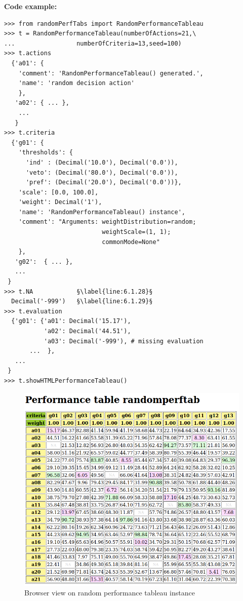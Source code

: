 \noindent \textbf{Code example:}
\begin{lstlisting}[caption={Generating a random performance tableau},label=list:6.1]
>>> from randomPerfTabs import RandomPerformanceTableau
>>> t = RandomPerformanceTableau(numberOfActions=21,\
...                 numberOfCriteria=13,seed=100)
>>> t.actions
  {'a01': {
    'comment': 'RandomPerformanceTableau() generated.',
    'name': 'random decision action'
    },
   'a02': { ... },
    ...
   }
>>> t.criteria
  {'g01': {
    'thresholds': {
      'ind' : (Decimal('10.0'), Decimal('0.0')),
      'veto': (Decimal('80.0'), Decimal('0.0')),
      'pref': (Decimal('20.0'), Decimal('0.0'))},
    'scale': [0.0, 100.0],
    'weight': Decimal('1'),
    'name': 'RandomPerformanceTableau() instance',
    'comment': "Arguments: weightDistribution=random;
                           weightScale=(1, 1);
                           commonMode=None"
    },
   'g02':  { ... },
   ...
 }
>>> t.NA            §\label{line:6.1.28}§
  Decimal('-999')   §\label{line:6.1.29}§
>>> t.evaluation
  {'g01': {'a01': Decimal('15.17'),
           'a02': Decimal('44.51'),
           'a03': Decimal('-999'), # missing evaluation
       ...  },
   ...
 }
>>> t.showHTMLPerformanceTableau()
\end{lstlisting}
\begin{figure}[ht]
\includegraphics[width=\hsize]{Figures/6-1-randomPerfTab1.png}
\caption{Browser view on random performance tableau instance}
\label{fig:6.1}       %
\end{figure}

